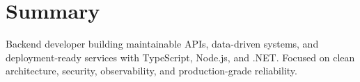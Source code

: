 \section{Summary}
Backend developer building maintainable APIs, data-driven systems, and deployment-ready services with TypeScript, Node.js, and .NET. Focused on clean architecture, security, observability, and production-grade reliability.

